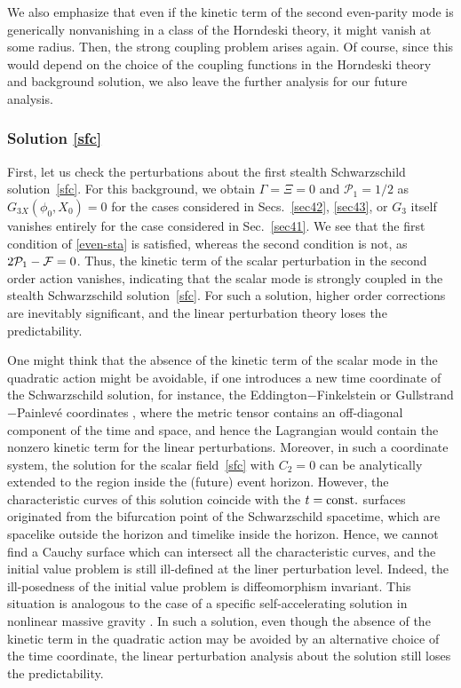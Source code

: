 \documentclass[prd,amsmath,amssymb,floatfix,superscriptaddress,notitlepage,nofootinbib,preprintnumbers]{revtex4-1}
\renewcommand{\P}{\mathcal{P}}
\begin{document}
We also emphasize
that even if the kinetic term of the second even-parity mode
is generically nonvanishing 
in a class of the Horndeski theory,
it might vanish at some radius.
Then, the strong coupling problem arises again.
Of course,
since this would depend on the choice of the
coupling functions in the Horndeski theory and background solution,
we also leave the further analysis for our future analysis.


\subsubsection{
Solution \eqref{sfc}}
\label{sec441}

First, let us check the perturbations about the first stealth Schwarzschild solution~\eqref{sfc}.
For this background, we obtain $\Gamma=\Xi=0$ and $\P_1=1/2$ 
as $G_{3X}(\phi_0,X_0)=0$ for the cases considered in Secs.~\ref{sec42}, \ref{sec43}, 
or $G_3$ itself vanishes entirely for the case considered in Sec.~\ref{sec41}.
We see that the first condition of \eqref{even-sta} is satisfied, 
whereas the second condition is not, as $2{\cal P}_1-{\cal F}=0$.
Thus, 
the kinetic term of the scalar perturbation in the second order action vanishes, 
indicating that the scalar mode is strongly coupled in
the stealth Schwarzschild solution~\eqref{sfc}. 
For such a solution,
higher order corrections are inevitably significant,
and the linear perturbation theory loses the predictability.


One might think that the absence of the kinetic term of the scalar mode in the quadratic action
might be avoidable,
if one introduces a new time coordinate of the Schwarzschild solution,
for instance,
the Eddington$-$Finkelstein 
or
Gullstrand$-$Painlev\'e coordinates \cite{Martel:2000rn},
where the metric tensor contains an off-diagonal component of the time and space,
and hence the Lagrangian 
would contain the nonzero kinetic term for the linear perturbations.
Moreover, in such a coordinate system,
the solution for the scalar field~\eqref{sfc} with $C_2=0$
can be analytically extended to the region inside the (future) event horizon.
However,
the characteristic curves of this solution
coincide with
the $t={\rm const.}$ surfaces originated from the bifurcation point
of the Schwarzschild spacetime,
which are spacelike outside the horizon
and timelike inside the horizon.
Hence, we cannot find a Cauchy surface
which can intersect all the characteristic curves,
and the initial value problem is still ill-defined at the liner perturbation level.
Indeed, the ill-posedness of the initial value problem is diffeomorphism invariant.
This situation is analogous 
to the case of a specific self-accelerating solution
in nonlinear massive gravity \cite{Motloch:2015gta}.
In such a solution,
even 
though the absence of the kinetic term in the quadratic action
may be avoided 
by an alternative choice of the time coordinate,
the linear perturbation analysis about the solution still loses the predictability.
\end{document}
